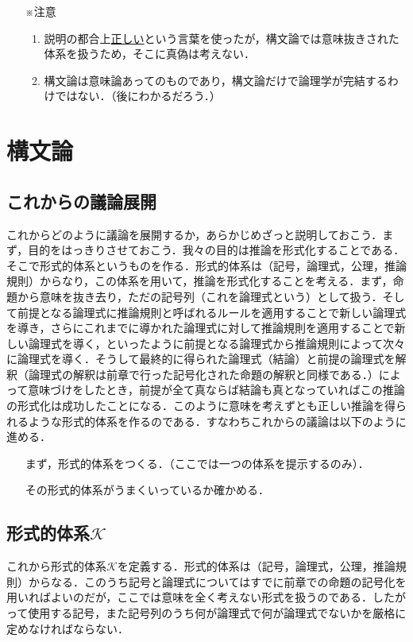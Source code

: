 \documentclass[10pt,b5paper,papersize,dvipdfmx]{jsbook}
\begin{document}
\begin{itemize}
  \item[※注意]
  \begin{enumerate}
    \item 説明の都合上\underline{正しい}という言葉を使ったが，構文論では意味抜きされた体系を扱うため，そこに真偽は考えない．
    \item 構文論は意味論あってのものであり，構文論だけで論理学が完結するわけではない．（後にわかるだろう．）
  \end{enumerate}
\end{itemize}

\section{構文論}
\subsection{これからの議論展開}
これからどのように議論を展開するか，あらかじめざっと説明しておこう．まず，目的をはっきりさせておこう．我々の目的は推論を形式化することである．そこで形式的体系というものを作る．形式的体系は（記号，論理式，公理，推論規則）からなり，この体系を用いて，推論を形式化することを考える．まず，命題から意味を抜き去り，ただの記号列（これを論理式という）として扱う．そして前提となる論理式に推論規則と呼ばれるルールを適用することで新しい論理式を導き，さらにこれまでに導かれた論理式に対して推論規則を適用することで新しい論理式を導く，といったように前提となる論理式から推論規則によって次々に論理式を導く．そうして最終的に得られた論理式（結論）と前提の論理式を解釈（論理式の解釈は前章で行った記号化された命題の解釈と同様である．）によって意味づけをしたとき，前提が全て真ならば結論も真となっていればこの推論の形式化は成功したことになる．このように意味を考えずとも正しい推論を得られるような形式的体系を作るのである．すなわちこれからの議論は以下のように進める．
\begin{itemize}
  \item[\maru{1}]まず，形式的体系をつくる．（ここでは一つの体系を提示するのみ）．
  \item[\maru{2}]その形式的体系がうまくいっているか確かめる．
\end{itemize}

\subsection{形式的体系$\mathcal K$}
これから形式的体系$\mathcal K$を定義する．形式的体系は（記号，論理式，公理，推論規則）からなる．このうち記号と論理式についてはすでに前章での命題の記号化を用いればよいのだが，ここでは意味を全く考えない形式を扱うのである．したがって使用する記号，また記号列のうち何が論理式で何が論理式でないかを厳格に定めなければならない．
\end{document}
